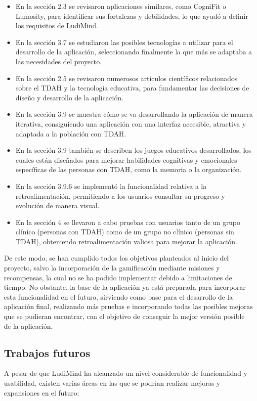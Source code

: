 \begin{itemize}
    \item En la sección 2.3 se revisaron aplicaciones similares, como CogniFit o Lumosity, para identificar sus fortalezas y debilidades, lo que ayudó a definir los requisitos de LudiMind.
    \item En la sección 3.7 se estudiaron las posibles tecnologías a utilizar para el desarrollo de la aplicación, seleccionando finalmente la que más se adaptaba a las necesidades del proyecto.
    \item En la sección 2.5 se revisaron numerosos artículos científicos relacionados sobre el TDAH y la tecnología educativa, para fundamentar las decisiones de diseño y desarrollo de la aplicación.
    \item En la sección 3.9 se muestra cómo se va desarrollando la aplicación de manera iterativa, consiguiendo una aplicación con una interfaz accesible, atractiva y adaptada a la población con TDAH.
    \item En la sección 3.9 también se describen los juegos educativos desarrollados, los cuales están diseñados para mejorar habilidades cognitivas y emocionales específicas de las personas con TDAH, como la memoria o la organización.
    \item En la sección 3.9.6 se implementó la funcionalidad relativa a la retroalimentación, permitiendo a los usuarios consultar su progreso y evolución de manera visual.
    \item En la sección 4 se llevaron a cabo pruebas con usuarios tanto de un grupo clínico (personas con TDAH) como de un grupo no clínico (personas sin TDAH), obteniendo retroalimentación valiosa para mejorar la aplicación.
\end{itemize}

\newpage
De este modo, se han cumplido todos los objetivos planteados al inicio del proyecto, salvo la incorporación de la gamificación mediante misiones y recompensas, la cual no se ha podido implementar debido a limitaciones de tiempo.
No obstante, la base de la aplicación ya está preparada para incorporar esta funcionalidad en el futuro, sirviendo como base para el desarrollo de la aplicación final, realizando más pruebas e incorporando todas las posibles mejoras que se pudieran encontrar, con el objetivo de conseguir la mejor versión posible de la aplicación.

\subsection{Trabajos futuros}
A pesar de que LudiMind ha alcanzado un nivel considerable de funcionalidad y usabilidad, existen varias áreas en las que se podrían realizar mejoras y expansiones en el futuro:


